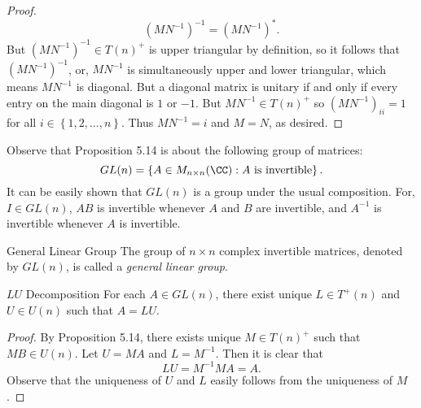 \documentclass[linearalgebraII]{subfiles}
\begin{document}
\begin{proof}
\begin{equation*}
            \left( MN^{-1} \right) ^{-1} = \left( MN^{-1} \right) ^*.
        \end{equation*}
        But $\left( MN^{-1} \right) ^{-1}\in T(n)^+$ is upper triangular by definition, so it follows that $\left( MN^{-1} \right) ^{-1}$, or, $MN^{-1}$ is simultaneously upper and lower triangular, which means $MN^{-1}$ is diagonal. But a diagonal matrix is unitary if and only if every entry on the main diagonal is $1$ or $-1$. But $MN^{-1}\in T(n)^+$ so $\left( MN^{-1} \right) _{ii} = 1$ for all $i\in\left\lbrace 1,2,\ldots,n \right\rbrace$. Thus $MN^{-1} = i$ and $M=N$, as desired.
    \end{proof}

    \begin{remark}
        Observe that Proposition 5.14 is about the following group of matrices:
        \begin{equation*}
            GL(n) = \left\lbrace A\in M_{n\times n}(\CC): A\text{ is invertible} \right\rbrace .
        \end{equation*}
        It can be easily shown that $GL(n)$ is a group under the usual composition. For, $I\in GL(n)$, $AB$ is invertible whenever $A$ and $B$ are invertible, and $A^{-1}$ is invertible whenever $A$ is invertible.
    \end{remark}

    \begin{definition}{General Linear Group}{}
        The group of $n\times n$ complex invertible matrices, denoted by $GL(n)$, is called a \emph{general linear group}.
    \end{definition}

    \begin{cor}{$LU$ Decomposition}
        For each $A\in GL(n)$, there exist unique $L\in T^+(n)$ and $U\in U(n)$ such that $A=LU$.
    \end{cor}	

    \begin{proof}
        By Proposition 5.14, there exists unique $M\in T(n)^+$ such that $MB\in U(n)$. Let $U=MA$ and $L=M^{-1}$. Then it is clear that
        \begin{equation*}
            LU = M^{-1}MA = A.
        \end{equation*}
        Observe that the uniqueness of $U$ and $L$ easily follows from the uniqueness of $M$.
    \end{proof}
\end{document}
